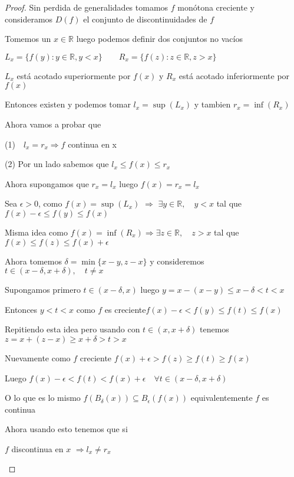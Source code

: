 \documentclass[12pt]{article}
\newcommand{\R}{\mathbb{R}}
\newcommand{\Ra}{\Rightarrow}
\theoremstyle{definition}
\begin{document}
\begin{proof}
  Sin perdida de generalidades tomamos $f$ monótona creciente y consideramos $D(f)$ el conjunto de discontinuidades de $f$

  Tomemos un $x \in \R$ luego podemos definir dos conjuntos no vacíos

  \begin{center} $ L_{x} = \{ f(y) : y \in \R, y<x\} \quad \quad      R_{x} = \{f(z): z \in \R, z>x \}$ \end{center}

  $L_{x}$ está acotado superiormente por $f(x)$ y $R_{x}$ está acotado inferiormente por $f(x)$

  Entonces existen y podemos tomar $l_{x} = \sup (L_{x})$ y tambien $r_{x} = \inf(R_{x})$

  Ahora vamos a probar que \begin{center} (1)$ \quad l_{x} = r_{x} \Ra f$ continua en x \end{center}

  (2) Por un lado sabemos que $ l_{x} \leq f(x) \leq r_{x}$

  Ahora supongamos que $r_{x} = l_{x}$ luego $f(x) = r_{x} = l_{x}$

  Sea $\epsilon  > 0$, como $f(x) = \sup(L_{x})$ $\Ra$ $\exists y \in \R , \quad y < x$ tal que $f(x) - \epsilon \leq f(y) \leq f(x)$

  Misma idea como $f(x) = \inf(R_{x}) \Ra \exists z \in \R,  \quad z > x$ tal que $ f(x) \leq f(z) \leq f(x) + \epsilon$

  Ahora tomemos $\delta = \min\{x - y , z -x \}$ y consideremos $t \in (x - \delta , x + \delta ), \quad t \neq x$

  Supongamos primero $t \in (x - \delta , x)$ luego $y = x - (x - y) \leq x - \delta < t < x$ 

  Entonces $y < t < x $ como $f$ es creciente$ f(x) - \epsilon < f(y) \leq f(t) \leq f(x) $

  Repitiendo esta idea pero usando con $t \in (x , x + \delta)$ tenemos $z = x + (z - x) \geq x + \delta > t > x $ 

  Nuevamente como $f$ creciente $f(x) + \epsilon > f(z) \geq f(t) \geq f(x)$

  Luego $f(x) - \epsilon < f(t) < f(x) + \epsilon \quad \forall t \in (x - \delta , x + \delta)$

  O lo que es lo mismo $f(B_{\delta}(x)) \subseteq B_{\epsilon}(f(x))$ equivalentemente $f$ es continua
 
  Ahora usando esto tenemos que si \begin{center} $f$ discontinua en $x$ $\Ra l_{x} \neq r_{x}$ \end{center}


\end{proof}
\end{document}
